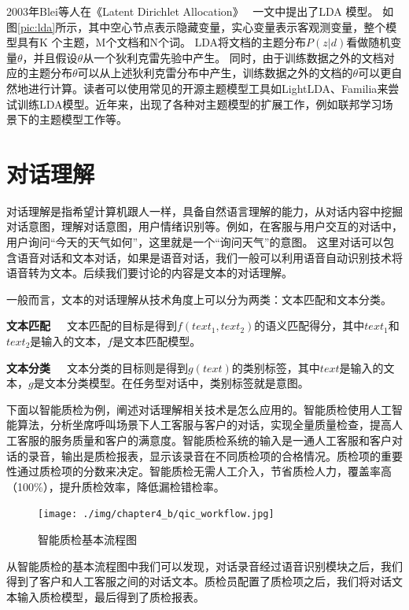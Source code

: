 \documentclass[graybox,envcountchap,sectrefs]{svmono}
\begin{document}
2003年Blei等人在《Latent Dirichlet Allocation》~\cite{blei2003latent} 一文中提出了LDA 模型。
如图\ref{pic:lda}所示，其中空心节点表示隐藏变量，实心变量表示客观测变量，整个模型具有K 个主题，M个文档和N个词。
LDA将文档的主题分布$P(z|d)$看做随机变量$\theta$，并且假设$\theta$从一个狄利克雷先验中产生。
同时，由于训练数据之外的文档对应的主题分布$\theta$可以从上述狄利克雷分布中产生，训练数据之外的文档的$\theta$可以更自然地进行计算。读者可以使用常见的开源主题模型工具如LightLDA\cite{yuan2015lightlda}、Familia\cite{jiang2018familia}来尝试训练LDA模型。近年来，出现了各种对主题模型的扩展工作，例如联邦学习场景下的主题模型\cite{jiang2019federated}工作等。

\section{对话理解}

对话理解是指希望计算机跟人一样，具备自然语言理解的能力，从对话内容中挖掘对话意图，理解对话意图，用户情绪识别等。例如，在客服与用户交互的对话中，用户询问“今天的天气如何”，这里就是一个“询问天气”的意图。
这里对话可以包含语音对话和文本对话，如果是语音对话，我们一般可以利用语音自动识别技术将语音转为文本。后续我们要讨论的内容是文本的对话理解。

一般而言，文本的对话理解从技术角度上可以分为两类：文本匹配和文本分类。

\textbf{文本匹配}~~~文本匹配的目标是得到$f(text_1, text_2)$的语义匹配得分，其中$text_1$和$text_2$是输入的文本，$f$是文本匹配模型。

\textbf{文本分类}~~~文本分类的目标则是得到${g(text)}$的类别标签，其中$text$是输入的文本，$g$是文本分类模型。在任务型对话中，类别标签就是意图。

下面以智能质检为例，阐述对话理解相关技术是怎么应用的。智能质检使用人工智能算法，分析坐席呼叫场景下人工客服与客户的对话，实现全量质量检查，提高人工客服的服务质量和客户的满意度。智能质检系统的输入是一通人工客服和客户对话的录音，输出是质检报表，显示该录音在不同质检项的合格情况。质检项的重要性通过质检项的分数来决定。智能质检无需人工介入，节省质检人力，覆盖率高（100\%），提升质检效率，降低漏检错检率。
\begin{figure}[h]
\centering
\texttt{[image: ./img/chapter4\_b/qic\_workflow.jpg]}
\caption{智能质检基本流程图}
\label{fig1}
\end{figure}

从智能质检的基本流程图中我们可以发现，对话录音经过语音识别模块之后，我们得到了客户和人工客服之间的对话文本。质检员配置了质检项之后，我们将对话文本输入质检模型，最后得到了质检报表。
\end{document}
